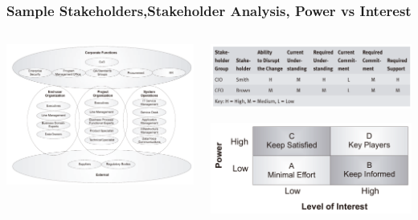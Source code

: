 \documentclass[aspectratio=169]{beamer}
\begin{document}
	{
		\begin{frame}
			\frametitle{Sample Stakeholders,Stakeholder Analysis, Power vs Interest}
			\begin{columns}
				\begin{column}{0.5\textwidth}
					\begin{center}
						\includegraphics[width=\textwidth]{../figures/sample_stakeholders}
					\end{center}
				\end{column}
				\begin{column}{0.5\textwidth}
					\begin{center}
						\includegraphics[width=\textwidth]{../figures/stakeholder_analysis}
					\end{center}
					\begin{center}
						\includegraphics[width=\textwidth]{../figures/power_vs_interest}
					\end{center}
				\end{column}
			\end{columns}
			
		\end{frame}
	}
	
\end{document}
